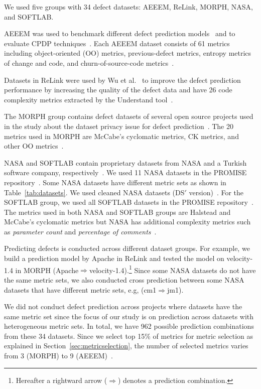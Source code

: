 We used five groups with 34 defect datasets: AEEEM, ReLink, MORPH, NASA,
and SOFTLAB.

AEEEM was used to benchmark different defect
prediction models~\cite{DAmbros12} and to evaluate CPDP
techniques~\cite{He14,Nam13}.
Each AEEEM dataset consists of 61 metrics including object-oriented (OO) metrics,
previous-defect metrics, entropy metrics of change and code, and churn-of-source-code
metrics~\cite{DAmbros12}.

Datasets in ReLink were used by Wu et
al.~\cite{Wu11} to improve the defect prediction performance by increasing the quality of the
defect data and have 26 code complexity metrics extracted by the Understand
tool~\cite{Understand}.

The MORPH group contains defect datasets of several open source projects used in
the study about the dataset privacy issue for defect prediction~\cite{Peters12}.
The 20 metrics used in MORPH are McCabe's cyclomatic metrics, CK metrics, and
other OO metrics~\cite{Peters12}.

NASA and SOFTLAB contain proprietary
datasets from NASA and a Turkish software company, respectively~\cite{Turhan09}.
We used 11 NASA datasets in the PROMISE
repository~\cite{promise12,Shepperd13}. Some NASA datasets have different metric sets as shown in Table~\ref{tab:datasets}. We used cleaned NASA datasets (DS$'$ version)~\cite{Shepperd13}.
For the SOFTLAB group, we used all SOFTLAB datasets in the PROMISE
repository~\cite{promise12}. The metrics used in both NASA and SOFTLAB groups
are Halstead and McCabe's cyclomatic metrics but NASA has additional
 complexity metrics such as {\em parameter count} and {\em percentage of comments}~\cite{promise12}.

Predicting defects is conducted across different dataset
groups.
For example, we build a prediction model by Apache in ReLink and tested the
model on velocity-1.4 in MORPH
(Apache$\Rightarrow$velocity-1.4).\footnote{Hereafter a rightward arrow
($\Rightarrow$) denotes a prediction combination.} Since some NASA datasets do not have the same metric sets, we also conducted cross prediction between some NASA datasets that have different metric sets, e.g, (cm1$\Rightarrow$jm1).

We did not conduct defect prediction across projects where datasets have the same metric set since the focus of our study is on prediction
across datasets with heterogeneous metric sets.
In total, we have 962 possible prediction combinations from these 34 datasets. Since we select top 15\% of metrics for metric selection as explained in Section~\ref{sec:metricselection}, the number of selected metrics varies from 3 (MORPH) to 9 (AEEEM)~\cite{Gao11}.


